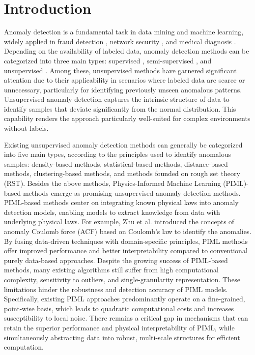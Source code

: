 \documentclass[times, review, 10pt]{elsarticle}
\begin{document}
\section{Introduction}

Anomaly detection is a fundamental task in data mining and machine learning,
widely applied in fraud detection \cite{devavarapu2024credit}, network security \cite{sabitha2022fuzzy}, and medical diagnosis \cite{li2023outlier}. 
Depending on the availability of labeled data, anomaly detection methods can be categorized into three main types: supervised \cite{zhang2026deep},
 semi-supervised \cite{lian2025semi},
 and unsupervised
\cite{hu2024multi}.
Among these, unsupervised methods have garnered significant attention due to their applicability in scenarios where labeled data are scarce or unnecessary, particularly for identifying previously unseen anomalous patterns. 
Unsupervised anomaly detection captures the intrinsic structure of data to identify samples that deviate significantly from the normal distribution. This capability renders the approach particularly well-suited for complex environments without labels.

Existing unsupervised anomaly detection methods can generally be categorized into five main types, according to the principles used to identify anomalous samples: density-based methods, statistical-based methods, distance-based methods, clustering-based methods, 
and methods founded on rough set theory (RST).
Besides the above methods, Physics-Informed Machine Learning (PIML)-based methods  
\cite{zhu2022high} emerge as promising unsupervised anomaly detection methods. 
PIML-based methods center on integrating known physical laws into anomaly detection models, enabling models to extract knowledge from data with underlying physical laws. For example, Zhu et al. \cite{zhu2022high} introduced the concepts of anomaly Coulomb force {(ACF)} based on Coulomb's law to identify the anomalies. By fusing data-driven techniques with domain-specific principles, PIML methods offer improved performance and better interpretability compared to conventional purely data-based approaches. 
Despite the growing success of PIML-based methods, many existing algorithms still suffer from high computational complexity, sensitivity to outliers, and single-granularity representation. These limitations hinder the robustness and detection accuracy of PIML models.
{Specifically, existing PIML approaches predominantly operate on a fine-grained, point-wise basis, which leads to quadratic computational costs and increases susceptibility to local noise. There remains a critical gap in mechanisms that can retain the superior performance and physical interpretability of PIML, while simultaneously abstracting data into robust, multi-scale structures for efficient computation.}
\end{document}
